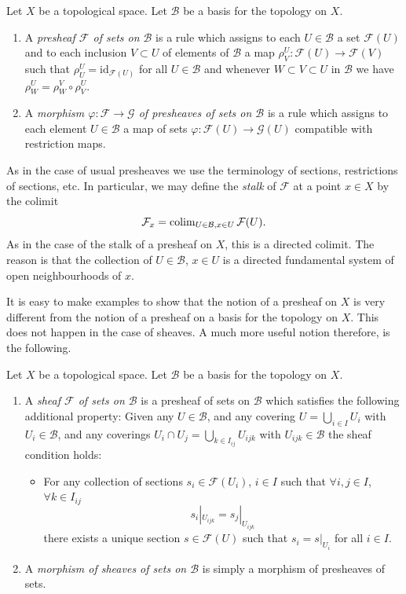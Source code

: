 \begin{definition}
\label{definition-presheaf-basis}
Let $X$ be a topological space. Let $\mathcal{B}$ be a
basis for the topology on $X$.
\begin{enumerate}
\item A {\it presheaf $\mathcal{F}$ of sets on $\mathcal{B}$}
is a rule which assigns to each $U \in \mathcal{B}$ a set
$\mathcal{F}(U)$ and to each inclusion $V \subset U$
of elements of $\mathcal{B}$ a map
$\rho^U_V : \mathcal{F}(U) \to \mathcal{F}(V)$ such that
$\rho^U_U = \text{id}_{\mathcal{F}(U)}$ for all $U \in \mathcal{B}$ and
whenever $W \subset V \subset U$ in $\mathcal{B}$ we have
$\rho^U_W = \rho^V_W \circ \rho ^U_V$.
\item A {\it morphism $\varphi : \mathcal{F} \to \mathcal{G}$
of presheaves of sets on $\mathcal{B}$} is a rule which assigns to each
element $U \in \mathcal{B}$ a map of sets $\varphi : \mathcal{F}(U)
\to \mathcal{G}(U)$ compatible with restriction maps.
\end{enumerate}
\end{definition}

\noindent
As in the case of usual presheaves we use the terminology of sections,
restrictions of sections, etc. In particular, we may define the
{\it stalk} of $\mathcal{F}$ at a point $x \in X$ by the
colimit
$$
\mathcal{F}_x = \mathop{\mathrm{colim}}\nolimits_{U\in \mathcal{B}, x\in U} \mathcal{F}(U).
$$
As in the case of the stalk of a presheaf on $X$, this is a
directed colimit. The reason is that the collection of $U\in \mathcal{B}$,
$x \in U$ is a directed fundamental system of open neighbourhoods of $x$.

\medskip\noindent
It is easy to make examples to show that the notion of a presheaf
on $X$ is very different from the notion of a presheaf on a basis
for the topology on $X$. This does not happen in the case of
sheaves. A much more useful notion therefore, is the following.

\begin{definition}
\label{definition-sheaf-basis}
Let $X$ be a topological space. Let $\mathcal{B}$ be a
basis for the topology on $X$.
\begin{enumerate}
\item A {\it sheaf $\mathcal{F}$ of sets on $\mathcal{B}$} is a presheaf
of sets on $\mathcal{B}$ which satisfies the following additional
property: Given any $U \in \mathcal{B}$, and any covering
$U = \bigcup_{i \in I} U_i$ with $U_i \in \mathcal{B}$, and
any coverings $U_i \cap U_j = \bigcup_{k \in I_{ij}} U_{ijk}$ with
$U_{ijk} \in \mathcal{B}$ the sheaf condition holds:
\begin{itemize}
\item[(**)] For any collection
of sections $s_i \in \mathcal{F}(U_i)$, $i \in I$ such that
$\forall i, j\in I$, $\forall k\in I_{ij}$
$$
s_i|_{U_{ijk}} = s_j|_{U_{ijk}}
$$
there exists a unique section $s \in \mathcal{F}(U)$ such that
$s_i = s|_{U_i}$ for all $i \in I$.
\end{itemize}
\item A {\it morphism of sheaves of sets on $\mathcal{B}$} is simply a
morphism of presheaves of sets.
\end{enumerate}
\end{definition}

